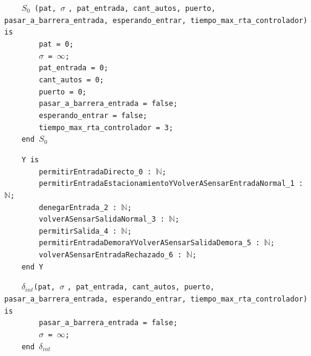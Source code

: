 \documentclass[12pt]{article}
\begin{document}
\begin{tcolorbox}[
    colback=black!5!white,
    colframe=black!80!white,
    boxrule=0.8pt,
    arc=2pt,
    left=5pt,
    right=5pt,
    top=5pt,
    bottom=5pt,
    fontupper=\ttfamily,
    breakable
]
\begin{flushleft}
\texttt{~~~~$S_0$ (pat, }$\sigma$ \texttt{, pat\_entrada, cant\_autos, puerto, pasar\_a\_barrera\_entrada, esperando\_entrar, tiempo\_max\_rta\_controlador) is} \\
\texttt{~~~~~~~~pat = 0;} \\
\texttt{~~~~~~~~}$\sigma$\texttt{ = }$\infty$\texttt{;} \\
\texttt{~~~~~~~~pat\_entrada = 0;} \\
\texttt{~~~~~~~~cant\_autos = 0;} \\
\texttt{~~~~~~~~puerto = 0;} \\
\texttt{~~~~~~~~pasar\_a\_barrera\_entrada = false;} \\
\texttt{~~~~~~~~esperando\_entrar = false;} \\
\texttt{~~~~~~~~tiempo\_max\_rta\_controlador = 3;} \\
\texttt{~~~~end }$S_0$
\end{flushleft}

\begin{flushleft}
\texttt{~~~~Y is} \\
\texttt{~~~~~~~~permitirEntradaDirecto\_0 : }\(\mathbb{N}\)\texttt{;} \\
\texttt{~~~~~~~~permitirEntradaEstacionamientoYVolverASensarEntradaNormal\_1 : }\(\mathbb{N}\)\texttt{;} \\
\texttt{~~~~~~~~denegarEntrada\_2 : }\(\mathbb{N}\)\texttt{;} \\
\texttt{~~~~~~~~volverASensarSalidaNormal\_3 : }\(\mathbb{N}\)\texttt{;} \\
\texttt{~~~~~~~~permitirSalida\_4 : }\(\mathbb{N}\)\texttt{;} \\
\texttt{~~~~~~~~permitirEntradaDemoraYVolverASensarSalidaDemora\_5 : }\(\mathbb{N}\)\texttt{;} \\
\texttt{~~~~~~~~volverASensarEntradaRechazado\_6 : }\(\mathbb{N}\)\texttt{;} \\
\texttt{~~~~end Y}
\end{flushleft}

\begin{flushleft}
\texttt{~~~~}$\delta_{int}$\texttt{(pat, }$\sigma$ \texttt{, pat\_entrada, cant\_autos, puerto, pasar\_a\_barrera\_entrada, esperando\_entrar, tiempo\_max\_rta\_controlador) is} \\
\texttt{~~~~~~~~pasar\_a\_barrera\_entrada = false;} \\
\texttt{~~~~~~~~}$\sigma$\texttt{ = }\(\infty\)\texttt{;} \\
\texttt{~~~~end }$\delta_{int}$
\end{flushleft}


\end{tcolorbox}
\end{document}
